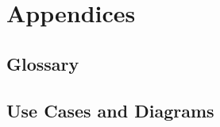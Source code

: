 \documentclass[12pt]{article}
\begin{document}


\section{Appendices}
\subsection{Glossary}
\subsection{Use Cases and Diagrams}




\end{document}
